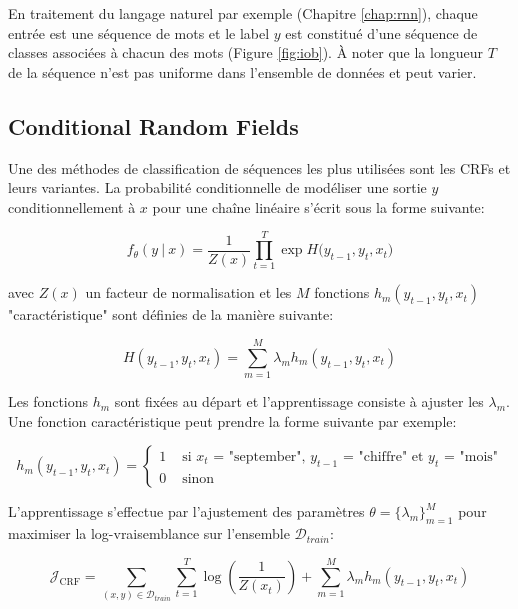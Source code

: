 En traitement du langage naturel par exemple (Chapitre \ref{chap:rnn}), chaque
entrée est une séquence de mots et le label $y$ est constitué d'une séquence de
classes associées à chacun des mots (Figure \ref{fig:iob}). À noter que la
longueur $T$ de la séquence n'est pas uniforme dans l'ensemble de données et
peut varier.

\subsection{Conditional Random Fields}

Une des méthodes de classification de séquences les plus utilisées sont les CRFs \citep{rnn6} et leurs variantes.
La probabilité conditionnelle de modéliser une sortie $y$ conditionnellement à
$x$ pour une chaîne linéaire s'écrit sous la forme suivante:

\begin{equation}
f_{\theta}(y~\vert~x) = \frac{1}{Z(x)}\prod_{t=1}^{T}\exp{H(y_{t-1}, y_{t}, x_{t}})
\end{equation}

avec $Z(x)$ un facteur de normalisation et les $M$ fonctions $h_{m}(y_{t-1},
y_{t}, x_{t})$ "caractéristique" sont définies de la manière suivante:

\begin{equation}
H(y_{t-1}, y_{t}, x_{t}) = \sum_{m=1}^{M}\lambda_{m}h_{m}(y_{t-1}, y_{t}, x_{t})
\end{equation}

Les fonctions $h_{m}$ sont fixées au départ et l'apprentissage consiste à
ajuster les $\lambda_{m}$. Une fonction caractéristique peut prendre la forme
suivante par exemple:

\begin{equation}
h_{m}(y_{t-1}, y_{t}, x_{t}) = 
\left\{
\begin{split}
1 &  \textrm{~si $x_{t}$ = "september", $y_{t-1}$ = "chiffre" et $y_{t}$ = "mois"} \\ 
0 & \textrm{~sinon}
\end{split}
\right.
\end{equation}

L'apprentissage s'effectue par l'ajustement des paramètres $\theta=\lbrace
\lambda_m \rbrace_{m=1}^{M}$ pour maximiser la log-vraisemblance sur l'ensemble
$\mathcal{D}_{train}$:

\begin{equation}
\mathcal{J}_{\textrm{CRF}} =\sum_{(x,y)\in\mathcal{D}_{train}} \sum_{t=1}^{T} \log (\dfrac{1}{Z(x_{t})}) + \sum_{m=1}^{M} \lambda_{m} h_{m}(y_{t-1}, y_{t}, x_{t})
\label{eq:loglikecrf}
\end{equation}

